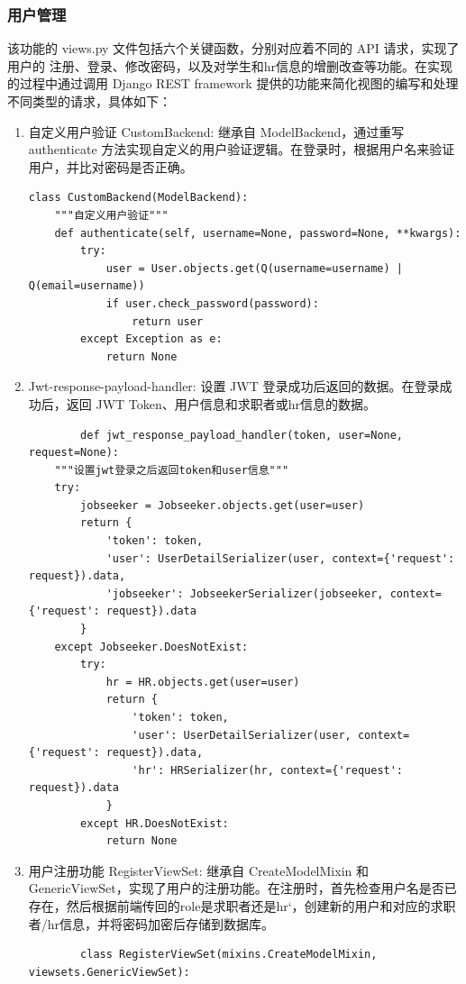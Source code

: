 \documentclass[UTF8,a4paper,10pt]{ctexart}
\begin{document}
\subsubsection{用户管理}
该功能的 views.py 文件包括六个关键函数，分别对应着不同的 API 请求，实现了用户的
注册、登录、修改密码，以及对学生和hr信息的增删改查等功能。在实现的过程中通过调用
Django REST framework 提供的功能来简化视图的编写和处理不同类型的请求，具体如下：
\begin{enumerate}
    \item 自定义用户验证 CustomBackend: 继承自 ModelBackend，通过重写authenticate 方法实现自定义的用户验证逻辑。在登录时，根据用户名来验证用户，并比对密码是否正确。
    \begin{lstlisting}
class CustomBackend(ModelBackend):
    """自定义用户验证"""
    def authenticate(self, username=None, password=None, **kwargs):
        try:
            user = User.objects.get(Q(username=username) | Q(email=username))
            if user.check_password(password):
                return user
        except Exception as e:
            return None
    \end{lstlisting}
    \item Jwt-response-payload-handler: 设置 JWT 登录成功后返回的数据。在登录成功后，返回 JWT Token、用户信息和求职者或hr信息的数据。
    \begin{lstlisting}
        def jwt_response_payload_handler(token, user=None, request=None):
    """设置jwt登录之后返回token和user信息"""
    try:
        jobseeker = Jobseeker.objects.get(user=user)
        return {
            'token': token,
            'user': UserDetailSerializer(user, context={'request': request}).data,
            'jobseeker': JobseekerSerializer(jobseeker, context={'request': request}).data
        }
    except Jobseeker.DoesNotExist:
        try:
            hr = HR.objects.get(user=user)
            return {
                'token': token,
                'user': UserDetailSerializer(user, context={'request': request}).data,
                'hr': HRSerializer(hr, context={'request': request}).data
            }
        except HR.DoesNotExist:
            return None
    \end{lstlisting}
    \item 用户注册功能 RegisterViewSet: 继承自 CreateModelMixin 和GenericViewSet，实现了用户的注册功能。在注册时，首先检查用户名是否已存在，然后根据前端传回的role是求职者还是hr‘，创建新的用户和对应的求职者/hr信息，并将密码加密后存储到数据库。
    \begin{lstlisting}
        class RegisterViewSet(mixins.CreateModelMixin, viewsets.GenericViewSet):

\end{lstlisting}
\end{enumerate}
\end{document}
